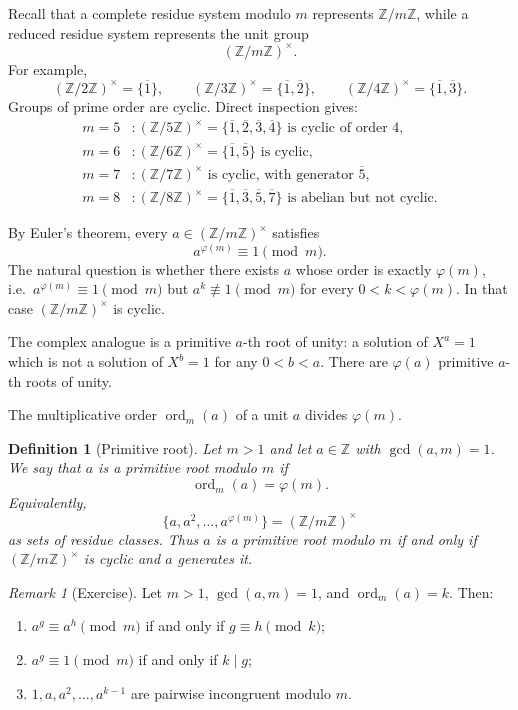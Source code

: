 \documentclass[11pt]{article}
\newtheorem{definition}[theorem]{Definition}
\theoremstyle{remark}
\newtheorem*{remark}{Remark}
\DeclareMathOperator{\gcdop}{gcd}
\DeclareMathOperator{\ord}{ord}
\newcommand{\Z}{\mathbb Z}
\newcommand{\phiE}{\varphi}
\newcommand{\units}[1]{\left(\mathbb Z/#1\mathbb Z\right)^\times}
\begin{document}
Recall that a complete residue system modulo $m$ represents $\Z/m\Z$, while
a reduced residue system represents the unit group
\[
    \units m.
\]
For example,
\[
    \units{2}=\{\overline 1\},
    \qquad
    \units{3}=\{\overline 1,\overline 2\},
    \qquad
    \units{4}=\{\overline 1,\overline 3\}.
\]
Groups of prime order are cyclic. Direct inspection gives:
\begin{align*}
    m=5&\colon
    \units 5=\{\overline 1,\overline 2,\overline 3,\overline 4\}
    \text{ is cyclic of order }4,\\
    m=6&\colon
    \units 6=\{\overline 1,\overline 5\}
    \text{ is cyclic},\\
    m=7&\colon
    \units 7
    \text{ is cyclic, with generator }\overline 5,\\
    m=8&\colon
    \units 8=\{\overline 1,\overline 3,\overline 5,\overline 7\}
    \text{ is abelian but not cyclic}.
\end{align*}

By Euler's theorem, every $a\in\units m$ satisfies
\[
    a^{\phiE(m)}\equiv 1\pmod m.
\]
The natural question is whether there exists $a$ whose order is exactly
$\phiE(m)$, i.e.\ $a^{\phiE(m)}\equiv 1\pmod m$ but $a^k\not\equiv 1\pmod m$
for every $0<k<\phiE(m)$. In that case $\units m$ is cyclic.

The complex analogue is a primitive $a$-th root of unity: a solution of
$X^a=1$ which is not a solution of $X^b=1$ for any $0<b<a$. There are
$\phiE(a)$ primitive $a$-th roots of unity.

The multiplicative order $\ord_m(a)$ of a unit $a$ divides $\phiE(m)$.

\begin{definition}[Primitive root]
Let $m>1$ and let $a\in\Z$ with $\gcdop(a,m)=1$. We say that $a$ is a
\emph{primitive root modulo $m$} if
\[
    \ord_m(a)=\phiE(m).
\]
Equivalently,
\[
    \{a,a^2,\ldots,a^{\phiE(m)}\}
    =
    \units m
\]
as sets of residue classes. Thus $a$ is a primitive root modulo $m$ if and
only if $\units m$ is cyclic and $a$ generates it.
\end{definition}

\begin{remark}[Exercise]
Let $m>1$, $\gcdop(a,m)=1$, and $\ord_m(a)=k$. Then:

\begin{enumerate}[label=\arabic*.]
    \item $a^g\equiv a^h\pmod m$ if and only if $g\equiv h\pmod k$;

    \item $a^g\equiv 1\pmod m$ if and only if $k\mid g$;

    \item $1,a,a^2,\ldots,a^{k-1}$ are pairwise incongruent modulo $m$.
\end{enumerate}
\end{remark}
\end{document}
